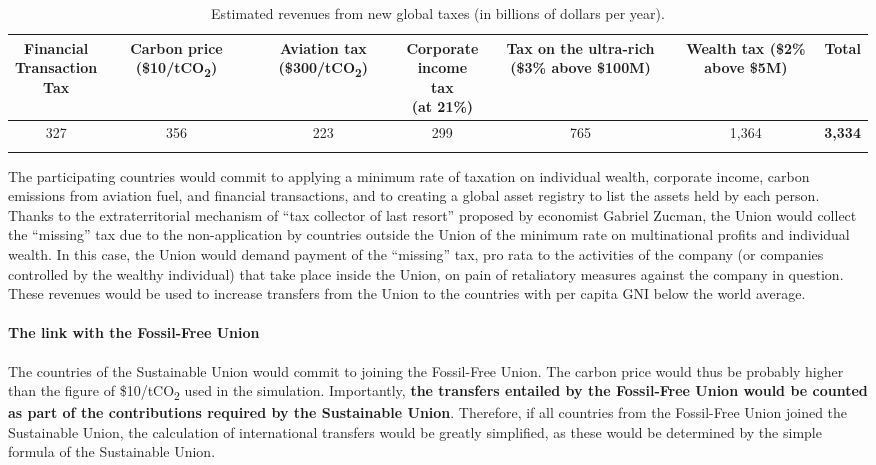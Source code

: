 \documentclass[12pt,english]{article}
\newcommand{\bo}[1]{\textbf{#1}}
\begin{document}
\begin{table}[h!]
  \centering 
  \caption{Estimated revenues from new global taxes (in billions of dollars per year).\label{tab:su}}
  \begin{tabular}[t]{ccccccc}
  \toprule
  \makecell{Financial\\Transaction\\Tax} & \makecell{Carbon\\price\\(\$10/tCO\textsubscript{2})} & \makecell{Aviation\\tax\\(\$300/tCO\textsubscript{2})} & \makecell{Corporate\\income tax\\(at 21\%)} & \makecell{Tax on the\\ultra-rich\\(\$3\% above\\ \$100M)} & \makecell{Wealth tax\\(\$2\% above\\ \$5M)} & \bo{Total} \\
  \midrule
  327 & 356 & 223 & 299 & 765 & 1,364 & \bo{3,334} \\
  \bottomrule\\[-0.81em]
  \end{tabular}
\end{table}

The participating countries would commit to applying a minimum rate of taxation on individual wealth, corporate income, carbon emissions from aviation fuel, and financial transactions, and to creating a global asset registry to list the assets held by each person. 
Thanks to the extraterritorial mechanism of ``tax collector of last resort'' proposed by economist Gabriel Zucman,\cite{zucman_blueprint_2024} the Union would collect the ``missing'' tax due to the non-application by countries outside the Union of the minimum rate on multinational profits and individual wealth. In this case, the Union would demand payment of the ``missing'' tax, pro rata to the activities of the company (or companies controlled by the wealthy individual) that take place inside the Union, on pain of retaliatory measures against the company in question. These revenues would be used to increase transfers from the Union to the countries with per capita GNI below the world average. 

\paragraph{The link with the Fossil-Free Union}
The countries of the Sustainable Union would commit to joining the Fossil-Free Union. The carbon price would thus be probably higher than the figure of \$10/tCO\textsubscript{2} used in the simulation. Importantly, \textbf{the transfers entailed by the Fossil-Free Union would be counted as part of the contributions required by the Sustainable Union}. Therefore, if all countries from the Fossil-Free Union joined the Sustainable Union, the calculation of international transfers would be greatly simplified, as these would be determined by the simple formula of the Sustainable Union. 
\end{document}
